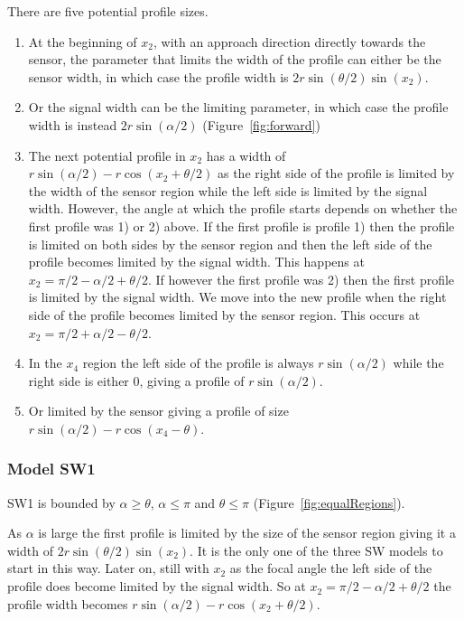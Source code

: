 There are five potential profile sizes.
\begin{enumerate}
\item At the beginning of $x_2$, with an approach direction directly towards the sensor, the parameter that limits the width of the profile can either be the sensor width,  in which case the profile width is $2r\sin\left(\theta/2\right)\sin(x_2)$.
\item Or the signal width can be the limiting parameter, in which case the profile width is instead $2r\sin(\alpha /2)$ (Figure~\ref{fig:forward})
\item The next potential profile in $x_2$ has a width of $r\sin(\alpha/2) - r\cos(x_2 + \theta/2)$ as the right side of the profile is limited by the width of the sensor region while the left side is limited by the signal width.
However, the angle at which the profile starts depends on whether the first profile was 1) or 2) above.
If the first profile is profile 1) then the profile is limited on both sides by the sensor region and then the left side of the profile becomes limited by the signal width.
This happens at $x_2 = \pi/2 - \alpha/2 + \theta/2$.
If however the first profile was 2) then the first profile is limited by the signal width.
We move into the new profile when the right side of the profile becomes limited by the sensor region.
This occurs at $x_2 = \pi/2 + \alpha/2 - \theta/2$.


\item In the $x_4$ region the left side of the profile is always $r\sin(\alpha /2)$ while the right side is either 0, giving a profile of $r\sin(\alpha /2)$.

\item Or limited by the sensor giving a profile of size $r\sin (\alpha /2) -r\cos(x_4-\theta) $.
\end{enumerate}

\subsubsection{Model SW1} \label{SW1}

SW1 is bounded by $\alpha \ge \theta$, $\alpha \le\pi$ and $\theta \le \pi$ (Figure~\ref{fig:equalRegions}).

As $\alpha $ is large the first profile is limited by the size of the sensor region giving it a width of $2r\sin\left(\theta/2\right)\sin(x_2)$.
It is the only one of the three SW models to start in this way.
Later on, still with $x_2$ as the focal angle the left side of the profile does become limited by the signal width.
So at $x_2= \pi/2 - \alpha/2 + \theta/2$ the profile width becomes $r\sin(\alpha/2) - r\cos(x_2 + \theta/2)$.

